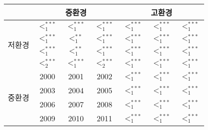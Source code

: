\begin{tabular}{c|c|c|c|c|c|c}
\hline & \multicolumn{3}{|c|}{중환경} & \multicolumn{3}{c}{고환경} \\
\hline \multirow{4}{*}{저환경} & $<_{1}^{* * *}$ & $<_{1}^{* * *}$ & $<_{1}^{* * *}$ & $<_{1}^{* * *}$ & $<_{1}^{* * *}$ & $<_{1}^{* * *}$ \\
\cline{2-7} & $<_{1}^{* * *}$ & $<_{1}^{* *}$ & $<_{1}^{* * *}$ & $<_{1}^{* * *}$ & $<_{1}^{* * *}$ & $<_{1}^{* * *}$ \\
\cline{2-7} & $<_{1}^{* * *}$ & $<_{1}^{* *}$ & $<_{1}^{* * *}$ & $<_{1 }^{* * *}$ & $<_{1 }^{* * *}$ & $<_{1 }^{* * *}$ \\
\cline{2-7} & $<_{2}^{* * *}$ & $<_{1}^{* * *}$ & $<_{2}^{* * *}$ & $<_{1}^{* * *}$ & $<_{1}^{* * *}$ & $<_{1}^{* * *}$ \\
\hline \multirow{4}{*}{중환경} & 2000 & 2001 & 2002 & $<_{1}^{* * *}$ & $<_{1}^{* * *}$ & $<_{1}^{* * *}$ \\
\cline{2-7} & 2003 & 2004 & 2005 & $<_{1}^{* * *}$ & $<_{1}^{* * *}$ & $<_{1}^{* * *}$ \\
\cline{2-7} & 2006 & 2007 & 2008 & $<_{1}^{* * *}$ & $<_{1}^{* * *}$ & $<_{1}^{* * *}$ \\
\cline{2-7} & 2009 & 2010 & 2011 & $<_{1}^{* * *}$ & $<_{1}^{* * *}$ & $<_{1}^{* * *}$ \\
\hline
\end{tabular}